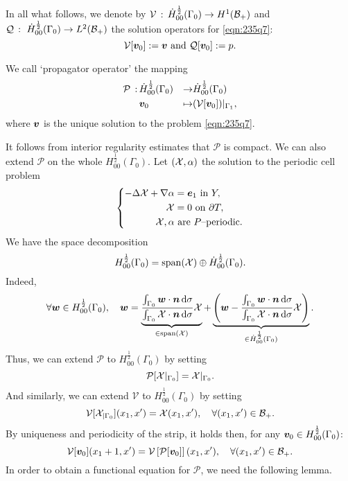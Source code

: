 \documentclass[a4paper,10pt,reqno]{amsart}
\begin{document}
In all what follows, we denote by $\mathcal{V}\,:\,\dot{H}^{\frac{1}{2}}_{00}(\Gamma_0)\to H^{1}(\mathcal{B}_+)$ and
$\mathcal{Q}\,:\ \dot{H}^{\frac{1}{2}}_{00}(\Gamma_0)\to L^{2}(\mathcal{B}_+)$ the solution
operators for \cref{eqn:235q7}: 
\[
    \mathcal{V}[{\bm v}_0]:={\bm v} \text{ and }\mathcal{Q}[{\bm v}_0]:=p.
\] 
\begin{definition}
    We call `propagator operator' the mapping   
    \begin{equation}
    \label{eqn:6gnkg}   
    \begin{aligned}
        \mathcal{P}\,:\,& \dot{H}^{\frac{1}{2}}_{00}(\Gamma_0)&  \to & \dot{H}^{\frac{1}{2}}_{00}(\Gamma_0) \\  
        & {\bm v}_0 &  \mapsto & (\mathcal{V}[{\bm v}_0])|_{\Gamma_1},
    \end{aligned}
    \end{equation}
    where ${\bm v}$ is the unique solution to the problem \cref{eqn:235q7}.
\end{definition}
It follows from interior regularity estimates that $\mathcal{P}$ is compact. We can
also extend $\mathcal{P}$ on the whole $H_{00}^{\frac{1}{2}}(\Gamma_0)$.
Let $(\mathcal{X},\alpha)$ the solution to the periodic cell problem   
\[
\left\{\begin{aligned}
        -\Delta \mathcal{X}+\nabla\alpha &=  {\bm e}_1 \textrm{ in } Y,\\ 
        \mathcal{X} &= 0\textrm{ on } \partial T,\\  
        \mathcal{X},\alpha &\text{ are $P$--periodic}.
\end{aligned}
\right.
\] 
We have the space decomposition     
\[
    H_{00}^{\frac{1}{2}}(\Gamma_0) = \mathrm{span}(\mathcal{X})\oplus \dot{H}^{\frac{1}{2}}_{00}(\Gamma_0).
\] 
Indeed,     
\[
\forall {\bm w}\in H_{00}^{\frac{1}{2}}(\Gamma_0),\quad
{\bm w}=\underbrace{\frac{\int_{\Gamma_0}{\bm w}\cdot{\bm n}\,\mathrm{d}\sigma}{\int_{\Gamma_0}\mathcal{X}\cdot{\bm n}\,\mathrm{d}
\sigma} \mathcal{X}}_{\in \mathrm{span}(\mathcal{X})}
+\underbrace{\left( {\bm w}-\frac{\int_{\Gamma_0}{\bm w}\cdot{\bm n}\,\mathrm{d}\sigma}{\int_{\Gamma_0}\mathcal{X}\cdot{\bm n}\,\mathrm{d}
\sigma} \mathcal{X} \right)}_{\in \dot{H}^{\frac{1}{2}}_{00}(\Gamma_0)}.
\] 
Thus, we can extend $\mathcal{P}$ to $H^{\frac{1}{2}}_{00}(\Gamma_0)$ by setting     
\[
    \mathcal{P}[\mathcal{X}|_{\Gamma_0}] = \mathcal{X}|_{\Gamma_0}.
\] 
And similarly, we can extend $\mathcal{V}$ to $H^{\frac{1}{2}}_{00}(\Gamma_0)$ by setting     
\[
    \mathcal{V}[\mathcal{X}_{|\Gamma_0}](x_1,x')=\mathcal{X}(x_1,x'),\quad \forall (x_1,x')\in
    \mathcal{B}_+.
\] 
By uniqueness and periodicity of the strip, it holds then, for any ${\bm v}_0\in
H^{\frac{1}{2}}_{00}(\Gamma_0)$: 
\[
    \mathcal{V}[{\bm v}_0](x_1+1,x')=\mathcal{V}\left[\mathcal{P}[{\bm v}_0]\right](x_1,x'),\quad
    \forall (x_1,x')\in \mathcal{B}_+.
\] 
In order to obtain a functional equation for $\mathcal{P}$, we need the following
lemma.
\end{document}
